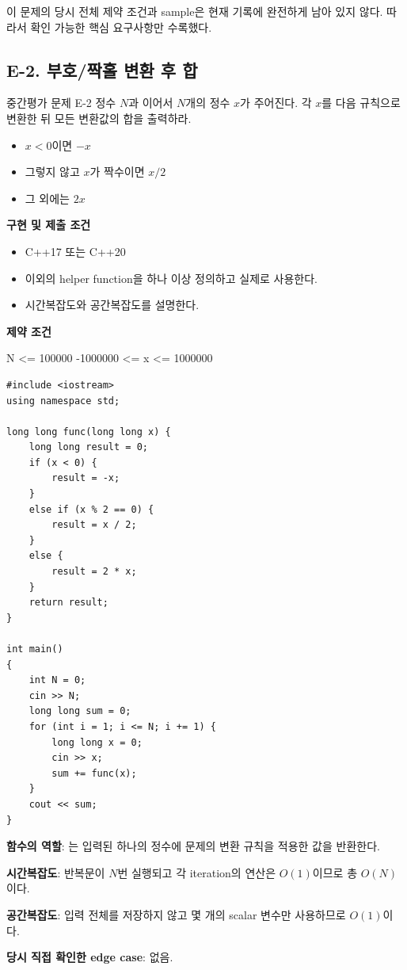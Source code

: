 \begin{notebox}[원문 보존 상태]
이 문제의 당시 전체 제약 조건과 sample은 현재 기록에 완전하게 남아 있지 않다. 따라서 확인 가능한 핵심 요구사항만 수록했다.
\end{notebox}

\subsection{E-2. 부호/짝홀 변환 후 합}
\begin{problembox}{중간평가 문제 E-2}
정수 $N$과 이어서 $N$개의 정수 $x$가 주어진다. 각 $x$를 다음 규칙으로 변환한 뒤 모든 변환값의 합을 출력하라.
\begin{itemize}
  \item $x<0$이면 $-x$
  \item 그렇지 않고 $x$가 짝수이면 $x/2$
  \item 그 외에는 $2x$
\end{itemize}

\textbf{구현 및 제출 조건}
\begin{itemize}
  \item C++17 또는 C++20
  \item {} 이외의 helper function을 하나 이상 정의하고 실제로 사용한다.
  \item 시간복잡도와 공간복잡도를 설명한다.
\end{itemize}

\textbf{제약 조건}
\begin{TextBlock}
N <= 100000
-1000000 <= x <= 1000000
\end{TextBlock}
\end{problembox}

\begin{answerbox}[학습자 제출 답안]
\begin{lstlisting}
#include <iostream>
using namespace std;

long long func(long long x) {
    long long result = 0;
    if (x < 0) {
        result = -x;
    }
    else if (x % 2 == 0) {
        result = x / 2;
    }
    else {
        result = 2 * x;
    }
    return result;
}

int main()
{
    int N = 0;
    cin >> N;
    long long sum = 0;
    for (int i = 1; i <= N; i += 1) {
        long long x = 0;
        cin >> x;
        sum += func(x);
    }
    cout << sum;
}
\end{lstlisting}

\textbf{함수의 역할}: 는 입력된 하나의 정수에 문제의 변환 규칙을 적용한 값을 반환한다.

\textbf{시간복잡도}: 반복문이 $N$번 실행되고 각 iteration의 연산은 $O(1)$이므로 총 $O(N)$이다.

\textbf{공간복잡도}: 입력 전체를 저장하지 않고 몇 개의 scalar 변수만 사용하므로 $O(1)$이다.

\textbf{당시 직접 확인한 edge case}: 없음.
\end{answerbox}

